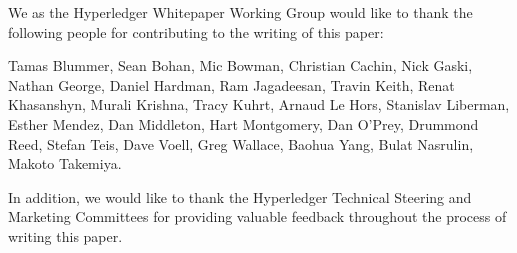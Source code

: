 We as the Hyperledger Whitepaper Working Group would like to thank the following people for contributing to the writing of this paper:

Tamas Blummer, Sean Bohan, Mic Bowman, Christian Cachin, Nick Gaski, Nathan George, Daniel Hardman, Ram Jagadeesan, Travin Keith, Renat Khasanshyn, Murali Krishna, Tracy Kuhrt, Arnaud Le Hors, Stanislav Liberman, Esther Mendez, Dan Middleton, Hart Montgomery, Dan O'Prey, Drummond Reed, Stefan Teis, Dave Voell, Greg Wallace, Baohua Yang, Bulat Nasrulin, Makoto Takemiya.


In addition, we would like to thank the Hyperledger Technical Steering and Marketing Committees for providing valuable feedback throughout the process of writing this paper.

